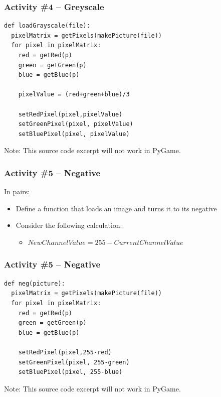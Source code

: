 \begin{frame}[fragile]
	\frametitle{Activity \#4 -- Greyscale}
	
\begin{lstlisting}
def loadGrayscale(file):
  pixelMatrix = getPixels(makePicture(file))
  for pixel in pixelMatrix:
    red = getRed(p)
    green = getGreen(p)
    blue = getBlue(p)
    
    pixelValue = (red+green+blue)/3
    
    setRedPixel(pixel,pixelValue)
    setGreenPixel(pixel, pixelValue)
    setBluePixel(pixel, pixelValue)
\end{lstlisting}

Note: This source code excerpt will not work in PyGame.

\end{frame}

\begin{frame}
	\frametitle{Activity \#5 -- Negative}
	
	In pairs:
	
	\vspace{2em}
	
	\begin{itemize}
		\item Define a function that loads an image and turns it to its negative
		\item Consider the following calculation:
		\begin{itemize}
			\item $New Channel Value = 255 - Current Channel Value$
		\end{itemize}
	\end{itemize}
\end{frame}

\begin{frame}[fragile]
	\frametitle{Activity \#5 -- Negative}
	
\begin{lstlisting}
def neg(picture):
  pixelMatrix = getPixels(makePicture(file))
  for pixel in pixelMatrix:
    red = getRed(p)
    green = getGreen(p)
    blue = getBlue(p)
        
    setRedPixel(pixel,255-red)
    setGreenPixel(pixel, 255-green)
    setBluePixel(pixel, 255-blue)
\end{lstlisting}

Note: This source code excerpt will not work in PyGame.

\end{frame}

